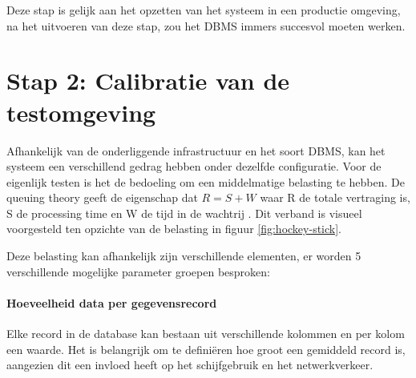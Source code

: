 Deze stap is gelijk aan het opzetten van het systeem in een productie omgeving, na het uitvoeren van deze stap, zou het DBMS immers succesvol moeten werken. 

\section{Stap 2: Calibratie van de testomgeving}
Afhankelijk van de onderliggende infrastructuur en het soort DBMS, kan het systeem een verschillend gedrag hebben onder dezelfde configuratie. Voor de eigenlijk testen is het de bedoeling om een middelmatige belasting te hebben. De queuing theory geeft de eigenschap dat $R = S + W$ waar R de totale vertraging is, S de processing time en W de tijd in de wachtrij \cite{millsap2003optimizing}. Dit verband is visueel voorgesteld ten opzichte van de belasting in figuur \ref{fig:hockey-stick}. 

\begin{figure}[h!] 
\centering
	\hfill
	\caption{}
\end{figure}
Deze belasting kan afhankelijk zijn verschillende elementen, er worden 5 verschillende mogelijke parameter groepen besproken:

\paragraph{Hoeveelheid data per gegevensrecord} Elke record in de database kan bestaan uit verschillende kolommen en per kolom een waarde. Het is belangrijk om te definiëren hoe groot een gemiddeld record is, aangezien dit een invloed heeft op het schijfgebruik en het netwerkverkeer.   

